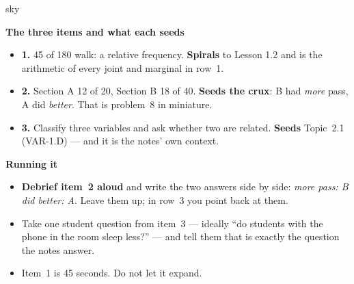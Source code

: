 \documentclass[10pt]{article}
\begin{document}
\boxguard[20]
\begin{skillbox}{sky}
\begin{minipage}[t]{0.48\linewidth}
    \textbf{The three items and what each seeds}
    \begin{itemize}
        \item \textbf{1.} 45 of 180 walk: a relative frequency. \textbf{Spirals} to Lesson 1.2
              and is the arithmetic of every joint and marginal in row~1.
        \item \textbf{2.} Section A 12 of 20, Section B 18 of 40. \textbf{Seeds the crux}:
              B had \emph{more} pass, A did \emph{better}. That is problem~8 in miniature.
        \item \textbf{3.} Classify three variables and ask whether two are related.
              \textbf{Seeds} Topic~2.1 (VAR-1.D) --- and it is the notes' own context.
    \end{itemize}
\end{minipage}
\hfill
\begin{minipage}[t]{0.48\linewidth}
    \textbf{Running it}
    \begin{itemize}
        \item \textbf{Debrief item~2 aloud} and write the two answers side by side:
              \emph{more pass: B} \quad \emph{did better: A}. Leave them up; in row~3 you
              point back at them.
        \item Take one student question from item~3 --- ideally ``do students with the phone
              in the room sleep less?'' --- and tell them that is exactly the question the
              notes answer.
        \item Item~1 is 45 seconds. Do not let it expand.
    \end{itemize}
\end{minipage}
\end{skillbox}
\end{document}
